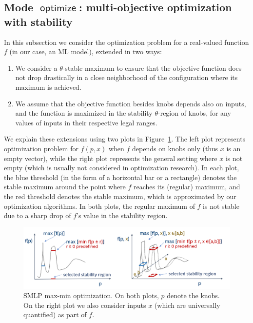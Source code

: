 \documentclass[a4paper,parskip=half]{article} %
\newcommand\changed[1]{{\color{blue}#1}}
\newcommand*\mode[1]{\operatorname{\mathsf{#1}}} %
\newcommand{\delete}[1]{}
\begin{document}
\subsection{Mode $\mode{optimize}$: multi-objective optimization with stability}\label{sec:stable:opt}

In this subsection we consider the optimization problem for a real-valued function $f$ (in our case, an ML model),
extended in two ways:
\begin{enumerate}
\item We consider a $\theta$-stable maximum to ensure that the objective function  does not drop drastically in a 
close neighborhood of the configuration where its maximum is achieved.
\item We assume that the objective function besides knobs depends also on inputs, and the %
function is maximized in the stability $\theta$-region of knobs, for any values of inputs in their respective legal ranges.
\end{enumerate}
We explain these extensions using two plots in Figure~\ref{smlp_maxmin}.
The left plot represents optimization problem for $f(p,x)$ when $f$ depends on knobs only (thus $x$ is an empty vector), 
while the right plot represents the general setting where $x$ is not empty (which is usually not considered in optimization research). 
In each plot, the blue threshold (in the form of a horizontal bar or a rectangle) denotes the stable maximum around the point 
where $f$ reaches its (regular) maximum, and the red threshold denotes the stable maximum, which is approximated by our 
optimization algorithms. In both plots, the regular maximum of $f$ is not stable due to a sharp drop of $f$'s value in the stability region. 
\delete{The right plot depicts the situation when input $x$ ranges in interval $[a, b]$, thus in \emph{max-min} optimization problem, 
formalized below in Formulas~\eqref{form:opt1}  and  \eqref{form:opt2}, the minimum of $f$ is calculated in the stability region 
of knobs $p$, with values of $x$ ranging in $[a,b]$.}

\begin{figure}[tp]
\center
\includegraphics[width= 0.7\columnwidth]{smlp_maxmin.PNG}
\caption{SMLP max-min optimization. On both plots, $p$ denote the knobs. On the right plot we also consider inputs $x$ 
(which are universally quantified) as part of $f$.} \label{smlp_maxmin}
\end{figure}
\end{document}
